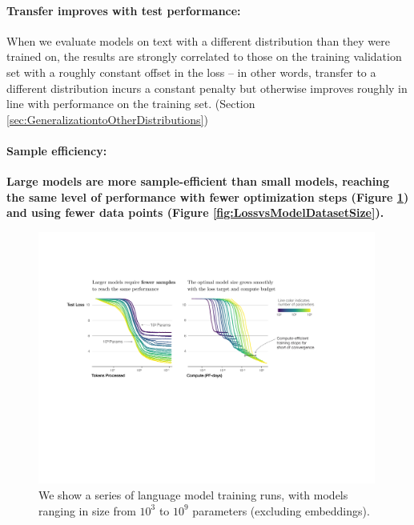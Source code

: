 \documentclass[english]{article}
\begin{document}
\paragraph{Transfer improves with test performance:} When we evaluate models on text with a different distribution than they were trained on, the results are strongly correlated to those on the training validation set with a roughly constant offset in the loss -- in other words, transfer to a different distribution incurs a constant penalty but otherwise improves roughly in line with performance on the training set. (Section \ref{sec:GeneralizationtoOtherDistributions})

\paragraph{Sample efficiency:} \textbf{Large models are  more sample-efficient than small models, reaching the same level of performance with fewer optimization steps (Figure \ref{fig:EfficiencyIllustration}) and using  fewer data points (Figure \ref{fig:LossvsModelDatasetSize}).}


\begin{figure}
\noindent \centering{} \includegraphics[width=0.99\textwidth]{EfficiencyIllustration}
\caption[Illustration of sample efficiency and compute efficiency.]{We show a series of language model training runs, with models ranging in size from $10^3$ to $10^9$ parameters (excluding embeddings). \label{fig:EfficiencyIllustration}}
\end{figure}
\end{document}
